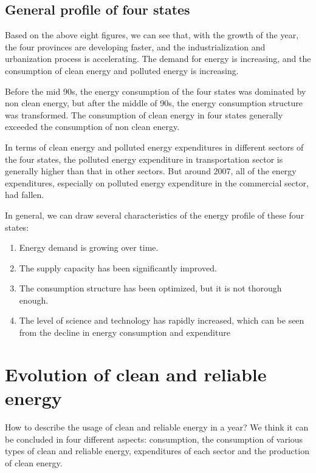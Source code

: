 \documentclass[a4paper]{article}
\begin{document}
\subsection{General profile of four states}

Based on the above eight figures, we can see that, with the growth of the year, the four provinces are developing faster, and the industrialization and urbanization process is accelerating. The demand for energy is increasing, and the consumption of clean energy and polluted energy is increasing. 

Before the mid 90s, the energy consumption of the four states was dominated by non clean energy, but after the middle of 90s, the energy consumption structure was transformed. The consumption of clean energy in four states generally exceeded the consumption of non clean energy. 

In terms of clean energy and polluted energy expenditures in different sectors of the four states, the  polluted energy expenditure in  transportation sector is generally higher than that in other sectors. But around 2007, all of the energy expenditures, especially on polluted energy expenditure in the commercial sector, had fallen.\cite{consumption}

In general, we can draw several characteristics of the energy profile of these four states:

\begin{enumerate}
\item Energy demand is growing over time.
\item The supply capacity has been significantly improved.
\item The consumption structure has been optimized, but it is not thorough enough.
\item The level of science and technology has rapidly increased, which can be seen from the decline in energy consumption and expenditure
\end{enumerate}

\section{Evolution of clean and reliable energy}

How to describe the usage of clean and reliable energy in a year? We think it can be concluded in four different aspects: consumption, the consumption of various types of clean and reliable energy, expenditures of each sector and the production of clean energy.
\end{document}
